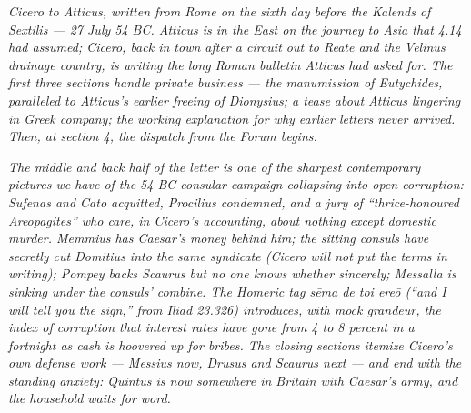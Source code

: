 
\textit{Cicero to Atticus, written from Rome on the sixth day before
the Kalends of Sextilis --- 27 July 54 BC. Atticus is in the East
on the journey to Asia that 4.14 had assumed; Cicero, back in town
after a circuit out to Reate and the Velinus drainage country, is
writing the long Roman bulletin Atticus had asked for. The first
three sections handle private business --- the manumission of
Eutychides, paralleled to Atticus's earlier freeing of Dionysius;
a tease about Atticus lingering in Greek company; the working
explanation for why earlier letters never arrived. Then, at
section 4, the dispatch from the Forum begins.}

\textit{The middle and back half of the letter is one of the
sharpest contemporary pictures we have of the 54 BC consular
campaign collapsing into open corruption: Sufenas and Cato
acquitted, Procilius condemned, and a jury of ``thrice-honoured
Areopagites'' who care, in Cicero's accounting, about nothing
except domestic murder. Memmius has Caesar's money behind him;
the sitting consuls have secretly cut Domitius into the same
syndicate (Cicero will not put the terms in writing); Pompey
backs Scaurus but no one knows whether sincerely; Messalla is
sinking under the consuls' combine. The Homeric tag \textit{sēma
de toi ere\=o} (``and I will tell you the sign,'' from Iliad
23.326) introduces, with mock grandeur, the index of corruption
that interest rates have gone from 4 to 8 percent in a fortnight
as cash is hoovered up for bribes. The closing sections itemize
Cicero's own defense work --- Messius now, Drusus and Scaurus next
--- and end with the standing anxiety: Quintus is now somewhere in
Britain with Caesar's army, and the household waits for word.}
